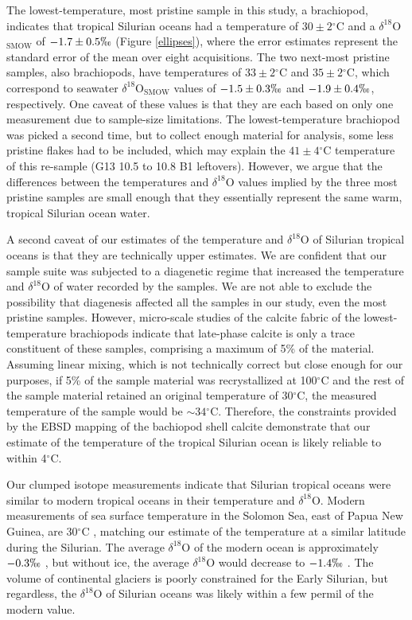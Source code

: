 \documentclass{article}
\newcommand{\deltao}{$\delta^{18}$}
\newcommand{\degrees}{$^{\circ}$}
\begin{document}
The lowest-temperature, most pristine sample in this study, a brachiopod, indicates that tropical Silurian oceans had a temperature of $30\pm 2$\degrees C and a \deltao O$_{\text{SMOW}}$ of $-1.7\pm 0.5\permil$ (Figure \ref{ellipses}), where the error estimates represent the standard error of the mean over eight acquisitions. The two next-most pristine samples, also brachiopods, have temperatures of $33\pm 2$\degrees C and $35\pm 2$\degrees C, which correspond to seawater \deltao O$_{\text{SMOW}}$ values of $-1.5\pm 0.3\permil$ and $-1.9\pm 0.4\permil$, respectively. One caveat of these values is that they are each based on only one measurement due to sample-size limitations. The lowest-temperature brachiopod was picked a second time, but to collect enough material for analysis, some less pristine flakes had to be included, which may explain the $41\pm 4$\degrees C temperature of this re-sample (G13 10.5 to 10.8 B1 leftovers). However, we argue that the differences between the temperatures and \deltao O values implied by the three most pristine samples are small enough that they essentially represent the same warm, tropical Silurian ocean water. 

A second caveat of our estimates of the temperature and \deltao O of Silurian tropical oceans is that they are technically upper estimates. We are confident that our sample suite was subjected to a diagenetic regime that increased the temperature and \deltao O of water recorded by the samples. We are not able to exclude the possibility that diagenesis affected all the samples in our study, even the most pristine samples. However, micro-scale studies of the calcite fabric of the lowest-temperature brachiopods indicate that late-phase calcite is only a trace constituent of these samples, comprising a maximum of 5\% of the material. Assuming linear mixing, which is not technically correct but close enough for our purposes, if 5\% of the sample material was recrystallized at 100\degrees C and the rest of the sample material retained an original temperature of 30\degrees C, the measured temperature of the sample would be $\sim34$\degrees C. Therefore, the constraints provided by the EBSD mapping of the bachiopod shell calcite demonstrate that our estimate of the temperature of the tropical Silurian ocean is likely reliable to within 4\degrees C. 

Our clumped isotope measurements indicate that Silurian tropical oceans were similar to modern tropical oceans in their temperature and \deltao O. Modern measurements of sea surface temperature in the Solomon Sea, east of Papua New Guinea, are 30\degrees C \citep{Reynolds1994}, matching our estimate of the temperature at a similar latitude during the Silurian. The average \deltao O of the modern ocean is approximately $-0.3\permil$ \citep{Shackleton1974}, but without ice, the average \deltao O would decrease to $-1.4\permil$ \citep{Lhomme2005}. The volume of continental glaciers is poorly constrained for the Early Silurian, but regardless, the \deltao O of Silurian oceans was likely within a few permil of the modern value. 
\end{document}
